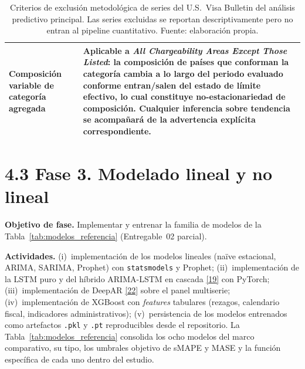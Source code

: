 \documentclass[12pt,letterpaper]{report}
\newcommand{\cita}[1]{\hyperref[bib:#1]{[#1]}}
\begin{document}
\begin{table}[H]
\begin{tabular}{>{\raggedright\arraybackslash}p{4.0cm}
                    >{\raggedright\arraybackslash}p{8.6cm}}
        Composición variable de categoría agregada & Aplicable a \textit{All Chargeability Areas Except Those Listed}: la composición de países que conforman la categoría cambia a lo largo del periodo evaluado conforme entran/salen del estado de límite efectivo, lo cual constituye no-estacionariedad de composición. Cualquier inferencia sobre tendencia se acompañará de la advertencia explícita correspondiente. \\
        \hline
    \end{tabular}
    \caption[Criterios de exclusión metodológica de series del Visa Bulletin.]{Criterios de exclusión metodológica de series del U.S.\ Visa Bulletin del análisis predictivo principal. Las series excluidas se reportan descriptivamente pero no entran al pipeline cuantitativo. Fuente: elaboración propia.}
    \label{tab:exclusion_visapredict}
\end{table}

\section{4.3 Fase 3. Modelado lineal y no lineal}

\textbf{Objetivo de fase.} Implementar y entrenar la familia de modelos de la Tabla~\ref{tab:modelos_referencia} (Entregable~02 parcial).

\textbf{Actividades.} (i)~implementación de los modelos lineales (naïve estacional, ARIMA, SARIMA, Prophet) con \texttt{statsmodels} y Prophet; (ii)~implementación de la LSTM puro y del híbrido ARIMA-LSTM en cascada \cita{19} con PyTorch; (iii)~implementación de DeepAR \cita{22} sobre el panel multiserie; (iv)~implementación de XGBoost con \textit{features} tabulares (rezagos, calendario fiscal, indicadores administrativos); (v)~persistencia de los modelos entrenados como artefactos \texttt{.pkl} y \texttt{.pt} reproducibles desde el repositorio. La Tabla~\ref{tab:modelos_referencia} consolida los ocho modelos del marco comparativo, su tipo, los umbrales objetivo de sMAPE y MASE y la función específica de cada uno dentro del estudio.
\end{document}
